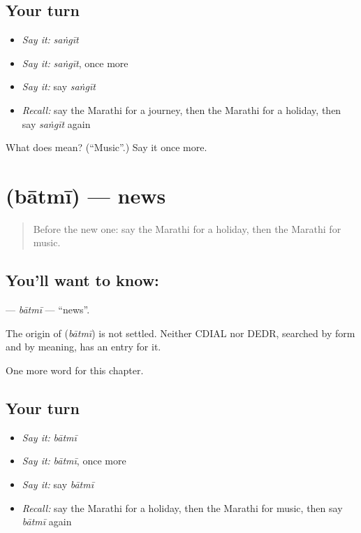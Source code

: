 \subsection*{Your turn}
\begin{itemize}
\raggedright
  \item \emph{Say it:} \emph{saṅgīt}
  \item \emph{Say it:} \emph{saṅgīt}, once more
  \item \emph{Say it:} say \emph{saṅgīt}
  \item \emph{Recall:} say the Marathi for a journey, then the Marathi for a holiday, then say \emph{saṅgīt} again
\end{itemize}

\begin{tcolorbox}[breakable,colback=teal!4,colframe=teal!35!black,title={Before you move on}]
What does  mean? (\textquotedblleft{}Music\textquotedblright{}.) Say it once more.
\end{tcolorbox}
\section[\texorpdfstring{\mr{बातमी} (bātmī)}{बातमी (bātmī)}]{ (bātmī) — news}

\label{lesson:MR-C120-batmi}



\begin{quote}
Before the new one: say the Marathi for a holiday, then the Marathi for music.
\end{quote}

\subsection*{You'll want to know: }
\textbf{} — \emph{bātmī} — \textquotedblleft{}news\textquotedblright{}.

\begin{cousinweb}
The origin of \textbf{} (\emph{bātmī}) is not settled. Neither CDIAL nor DEDR, searched by form and by meaning, has an entry for it.
\end{cousinweb}

\begin{grammarlens}[title={What you've built}]
One more word for this chapter.
\end{grammarlens}

\subsection*{Your turn}
\begin{itemize}
\raggedright
  \item \emph{Say it:} \emph{bātmī}
  \item \emph{Say it:} \emph{bātmī}, once more
  \item \emph{Say it:} say \emph{bātmī}
  \item \emph{Recall:} say the Marathi for a holiday, then the Marathi for music, then say \emph{bātmī} again
\end{itemize}

